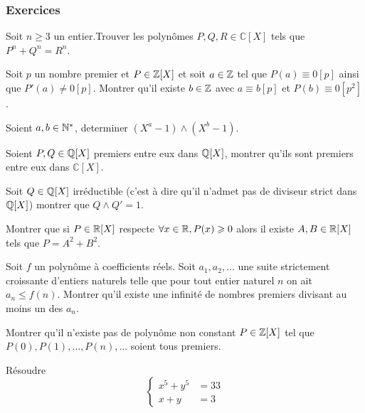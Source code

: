 \subsubsection{Exercices}


\begin{exo}[Liouville,D]
Soit $n\geq 3 $ un entier.Trouver les polynômes $P,Q,R\in \mathbb{C}[X]$ tels que $P^n+Q^n=R^n$.
\end{exo}


\begin{exo}[Hensel,M-D]
Soit $p$ un nombre premier et $P\in \mathbb Z[X]$ et soit $a\in \mathbb Z$ tel que $P(a)\equiv 0 [p]$ ainsi que $P'(a)\neq 0 [p] $. Montrer qu'il existe $b\in \mathbb Z$ avec $a\equiv b[p]$ et $P(b)\equiv 0 [p^2]$.
\end{exo}


\begin{exo}[Euclide,M]
Soient $a,b\in \mathbb N^*$, determiner $(X^a-1)\wedge(X^b-1) $.
\end{exo}


\begin{exo}
Soient $P,Q\in \mathbb Q[X]$ premiers entre eux dans $\mathbb Q[X]$, montrer qu'ils sont premiers entre eux dans $\mathbb{C}[X]$.
\end{exo}


\begin{exo}
Soit $Q\in \mathbb Q[X]$ irréductible (c'est à dire qu'il n'admet pas de diviseur strict dans $\mathbb Q[X]$) montrer que $Q\wedge Q'=1$.
\end{exo}


\begin{exo}
Montrer que si $P\in \mathbb R[X]$ respecte $\forall x \in \mathbb R, P(x)\geqslant 0$ alors il existe $A,B\in \mathbb R[X]$ tels que $P=A^2+B^2$.
\end{exo}


\begin{exo}[M-D]
Soit $f$ un polynôme à coefficients réels. Soit $a_1,a_2,\ldots$ une suite strictement croissante d'entiers naturels telle que pour tout entier naturel $n$ on ait $a_n\le f(n)$. Montrer qu'il existe une infinité de nombres premiers divisant au moins un des $a_n$.
\end{exo}


\begin{exo}[F-M]
Montrer qu'il n'existe pas de polynôme non constant $P\in \mathbb Z[X]$ tel que $P(0),P(1),\dots,P(n),\dots$ soient tous premiers.
\end{exo}


\begin{exo}[M]
Résoudre
$$\begin{cases} x^5 + y^5 & = 33 \\ x + y & = 3 \end{cases}$$
\end{exo}


